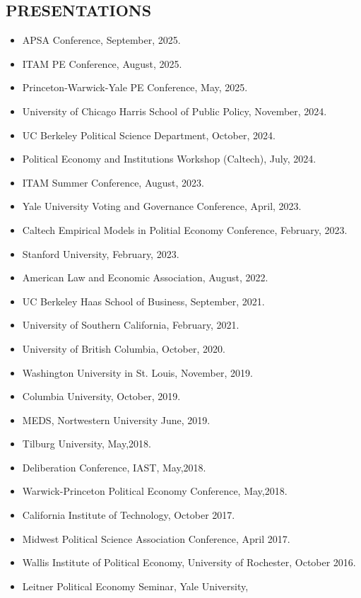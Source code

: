 \documentclass[margin, 10pt]{res} %
\begin{document}
\begin{resume}
\section{PRESENTATIONS}
\begin{itemize} \itemsep -2pt
\item[-] APSA Conference, September, 2025.
\item[-] ITAM PE Conference, August, 2025.
\item[-] Princeton-Warwick-Yale PE Conference, May, 2025.
\item[-] University of Chicago Harris School of Public Policy, November, 2024.
\item[-] UC Berkeley Political Science Department, October, 2024.
\item[-] Political Economy and Institutions Workshop (Caltech), July, 2024.
\item[-] ITAM Summer Conference, August, 2023.
\item[-] Yale University Voting and Governance Conference, April, 2023.
\item[-] Caltech Empirical Models in
  Politial Economy Conference, February, 2023.
\item[-] Stanford University, February, 2023.
\item[-] American Law and Economic Association, August, 2022.
\item[-] UC Berkeley Haas School of Business, September, 2021.
\item[-] University of Southern California, February, 2021.
\item[-] University of British Columbia, October, 2020.
\item[-] Washington University in St. Louis, November, 2019.
\item[-] Columbia University, October, 2019.
\item[-] MEDS, Nortwestern University  June, 2019.
\item[-]  Tilburg University, May,2018.
\item[-]  Deliberation Conference, IAST, May,2018.
\item[-] Warwick-Princeton Political Economy Conference, May,2018.
\item[-] California Institute of Technology, October 2017.
\item[-] Midwest Political Science Association Conference, April 2017.
\item[-] Wallis Institute of Political Economy, University of Rochester, October 2016.
\item[-] Leitner Political Economy Seminar, Yale University,

\end{itemize}
\end{resume}
\end{document}
